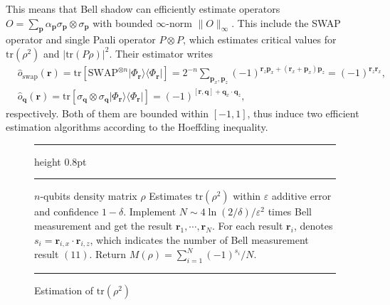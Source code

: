 \documentclass[aps,%
twocolumn,%
floatfix,%
pra,%
amsfonts,%
groupedaddress,%
superscriptaddress]{revtex4-2}%
\newcommand{\bra}[1]{\langle #1\rvert}
\newcommand{\ket}[1]{\lvert #1\rangle}
\newcommand{\1}{\mathbbm{1}}
\begin{document}
This means that Bell shadow can efficiently estimate operators $O = \sum_{\mathbf{p}} \alpha_{\mathbf{p}} \sigma_{\mathbf{p}} \otimes \sigma_{\mathbf{p}}$ with bounded $\infty$-norm $\|O\|_{\infty}$.
This include the SWAP operator and single Pauli operator $P \otimes P$, which estimates critical values for $\mathrm{tr}(\rho^2)$ and $|\mathrm{tr}(P \rho)|^2$. Their estimator writes 
\begin{align}
    &\hat{o}_{\mathrm{swap}}(\mathbf{r}) = \mathrm{tr}\left[\mathrm{SWAP}^{\otimes n} \ket{\Phi_{\mathbf{r}}}\!\bra{{\Phi_{\mathbf{r}}}}\right] = 2^{-n}\sum_{\mathbf{p}_x,\mathbf{p}_z} (-1)^{\mathbf{r}_z\mathbf{p}_x + (\mathbf{r}_x + \mathbf{p}_x)\mathbf{p}_z} = (-1)^{\mathbf{r}_z \mathbf{r}_x},\\
&\hat{o}_{\mathbf{q}}(\mathbf{r}) =\mathrm{tr}\left[\sigma_{\mathbf{q}} \otimes \sigma_{\mathbf{q}} \ket{\Phi_{\mathbf{r}}}\!\bra{{\Phi_{\mathbf{r}}}}\right] =(-1)^{[\mathbf{r}, \mathbf{q}] + \mathbf{q}_x\cdot \mathbf{q}_z},\label{eq:bell_shadow_eig}
\end{align}
respectively. Both of them are bounded within $[-1,1]$, thus induce two efficient estimation algorithms according to the Hoeffding inequality.
\begin{figure}[htbp!]
    \centering
    \hrule height 0.8pt \vspace{-8pt} 
\caption{Estimation of $\text{tr}(\rho^2)$~\cite{hangleiter2024bell}}
    \label{alg:Bell_for_purity}
    \vspace{1pt} \hrule \vspace{2pt}
    \begin{algorithmic}[1]
        \Require  $n$-qubits density matrix $\rho$
        \Ensure Estimates $\text{tr}(\rho^2)$ within $\varepsilon$ additive error and confidence $1 -\delta$.
        \State Implement $N \sim 4 \ln(2/\delta)/\varepsilon^2$ times Bell measurement and get the result $\mathbf{r}_1, \cdots, \mathbf{r}_N$.
        \State For each result $\mathbf{r}_i$, denotes $s_i =\mathbf{r}_{i,x}\cdot \mathbf{r}_{i,z} $, which indicates the number of Bell measurement result $(11)$.
        \State Return ${M}(\rho) = \sum_{i = 1}^N(-1)^{s_i}/{N}$.
        \end{algorithmic}
    \vspace{5pt} \hrule %
\end{figure}
\end{document}
